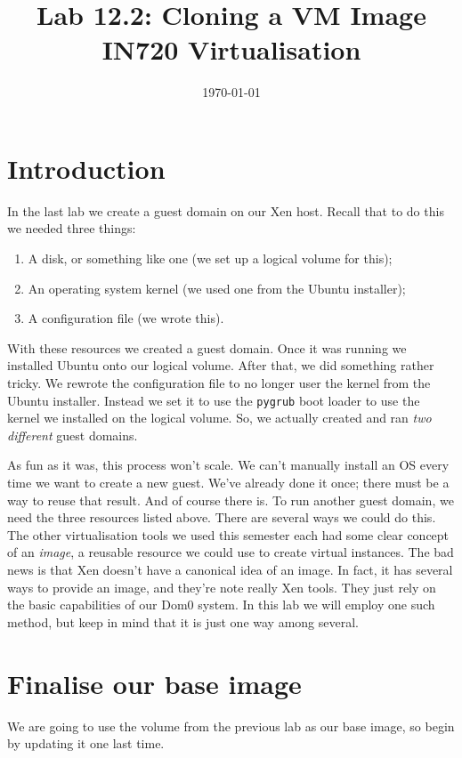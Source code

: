 \documentclass{article}
\begin{document}
\title{Lab 12.2: Cloning a VM Image\\ IN720 Virtualisation}
\date{\today}
\maketitle

\section*{Introduction}
In the last lab we create a guest domain on our Xen host. Recall that to do this we needed three things:

\begin{enumerate}
  \item A disk, or something like one (we set up a logical volume for this);
  \item An operating system kernel (we used one from the Ubuntu installer);
  \item A configuration file (we wrote this).
\end{enumerate}

With these resources we created a guest domain. Once it was running we installed Ubuntu onto our logical volume. After that, we did something 
rather tricky. We rewrote the configuration file to no longer user the kernel from the Ubuntu installer. Instead we set it to use the \texttt{pygrub}
boot loader to use the kernel we installed on the logical volume. So, we actually created and ran \emph{two different} guest domains.

As fun as it was, this process won't scale. We can't manually install an OS every time we want to create a new guest. We've already done it once; there
must be a way to reuse that result. And of course there is. To run another guest domain, we need the three resources listed above. There are several ways we could do this. The other virtualisation tools we used this semester each had some clear concept of an \emph{image}, a reusable resource we could use to create virtual instances. The bad news is that Xen doesn't have a canonical idea of an image. In fact, it has several ways to provide an image, and they're note really Xen tools. They just rely on the basic capabilities of our Dom0 system. In this lab we will employ one such method, but keep in mind that it is just one way among several.

\section{Finalise our base image}
We are going to use the volume from the previous lab as our base image, so begin by updating it one last time.
\end{document}
